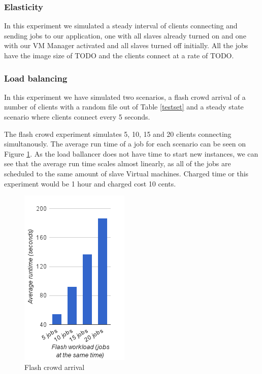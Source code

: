 
\subsubsection{Elasticity}
\label{elastic}
In this experiment we simulated a steady interval of clients connecting and sending jobs to our application, one with all slaves already turned on and one with our VM Manager activated and all slaves turned off initially. All the jobs have the image size of TODO and the clients connect at a rate of TODO.


\subsubsection{Load balancing}
In this experiment we have simulated two scenarios, a flash crowd arrival of a number of clients with a random file out of Table \ref{testset} and a steady state scenario where clients connect every 5 seconds. %

The flash crowd experiment simulates 5, 10, 15 and 20 clients connecting simultanously. The average run time of a job for each scenario can be seen on Figure \ref{flash}. As the load ballancer does not have time to start new instances, we can see that the average run time scales almost linearly, as all of the jobs are scheduled to the same amount of slave Virtual machines. Charged time or this experiment would be 1 hour and charged cost 10 cents.

\begin{figure}
 \centering
 \label{flash}
 \includegraphics{flash-graph}
 \caption{Flash crowd arrival}
\end{figure}

